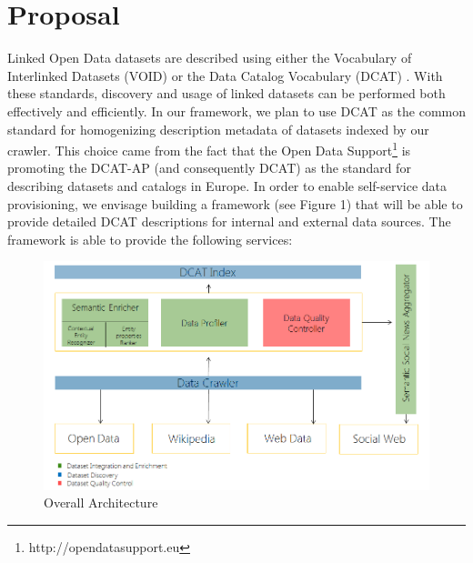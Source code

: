 \documentclass[onecolumn, crcready]{iosart2c}
\begin{document}

\section{Proposal}
Linked Open Data datasets are described using either the Vocabulary of Interlinked Datasets (VOID) \cite{Cyganiak:11:DLD} or the Data Catalog Vocabulary (DCAT) \cite{Maali:13:DCV}. With these standards, discovery and usage of linked datasets can be performed both effectively and efficiently. In our framework, we plan to use DCAT as the common standard for homogenizing description metadata of datasets indexed by our crawler. This choice came from the fact that the Open Data Support\footnote{http://opendatasupport.eu} is promoting the DCAT-AP (and consequently DCAT) as the standard for describing datasets and catalogs in Europe.
In order to enable self-service data provisioning, we envisage building a framework (see Figure 1) that will be able to provide detailed DCAT descriptions for internal and external data sources. The framework is able to provide the following services:
\begin{figure}[ht!]
  \centering
    \includegraphics[scale=0.5]{overall-architecture.png}
  \caption{Overall Architecture}
\end{figure}
\end{document}
